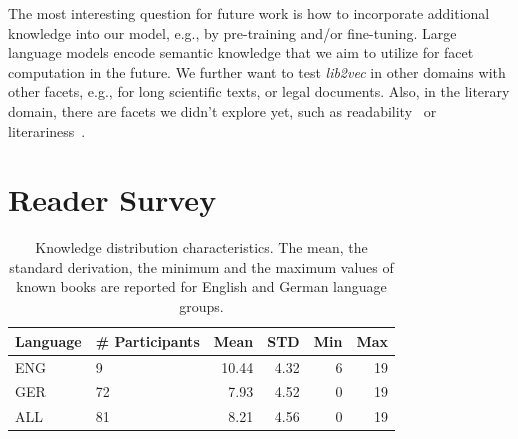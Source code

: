 \documentclass[11pt]{article}
\begin{document}
The most interesting question for future work is how to incorporate additional knowledge into our model, e.g., by pre-training and/or fine-tuning.
Large language models encode semantic knowledge that we aim to utilize for facet computation in the future.
We further want to test \emph{lib2vec} in other domains with other facets, e.g., for long scientific texts, or legal documents.
Also, in the literary domain, there are facets we didn't explore yet, such as readability~\cite{feng_2010} or literariness~\cite{van_2019}.





%




\clearpage
\appendix


\section{Reader Survey}
\label{appendix:survey}
\begin{table}
	\centering
	
	\begin{tabular}{lR{1cm}rrrr}
		\toprule
		Language & \# Participants &	Mean    & STD    & Min & Max \\
		\midrule
		ENG      &  9			& 10.44 & 4.32 & 6   & 19  \\
		GER      & 	72			& 7.93  & 4.52 & 0   & 19 \\
		ALL      &  81			& 8.21  & 4.56 & 0   & 19  \\
		\bottomrule
	\end{tabular}
	\caption[Knowledge Distribution Characteristics]{Knowledge distribution characteristics. 
		The mean, the standard derivation, the minimum and the maximum values of known books are reported for English and German language groups.}
	\label{tab:known_books}
\end{table}
\end{document}

